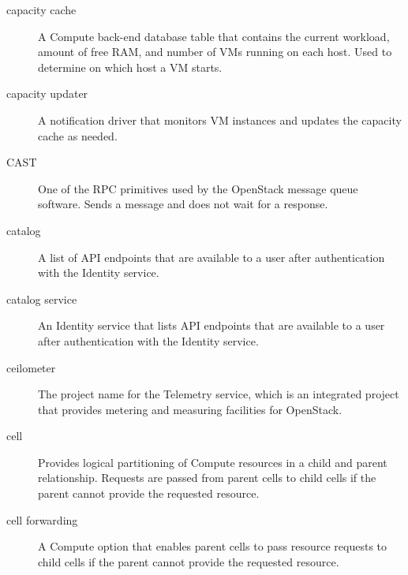 \documentclass[letterpaper,10pt,english]{sphinxmanual}
\begin{document}
\begin{description}
\item[{capacity cache}] \leavevmode{}\label{_source/glossary:term-capacity-cache}
A Compute back-end database table that contains the current
workload, amount of free RAM, and number of VMs running on each host.
Used to determine on which host a VM starts.

\item[{capacity updater}] \leavevmode{}\label{_source/glossary:term-capacity-updater}
A notification driver that monitors VM instances and updates the
capacity cache as needed.

\item[{CAST}] \leavevmode{}\label{_source/glossary:term-cast}
One of the RPC primitives used by the OpenStack message queue
software. Sends a message and does not wait for a response.

\item[{catalog}] \leavevmode{}\label{_source/glossary:term-catalog}
A list of API endpoints that are available to a user after
authentication with the Identity service.

\item[{catalog service}] \leavevmode{}\label{_source/glossary:term-catalog-service}
An Identity service that lists API endpoints that are available
to a user after authentication with the Identity service.

\item[{ceilometer}] \leavevmode{}\label{_source/glossary:term-ceilometer}
The project name for the Telemetry service, which is an
integrated project that provides metering and measuring facilities for
OpenStack.

\item[{cell}] \leavevmode{}\label{_source/glossary:term-cell}
Provides logical partitioning of Compute resources in a child
and parent relationship. Requests are passed from parent cells to
child cells if the parent cannot provide the requested
resource.

\item[{cell forwarding}] \leavevmode{}\label{_source/glossary:term-cell-forwarding}
A Compute option that enables parent cells to pass resource
requests to child cells if the parent cannot provide the requested
resource.


\end{description}
\end{document}
